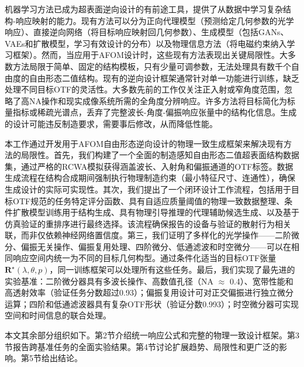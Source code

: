 机器学习方法已成为超表面逆向设计的有前途工具，提供了从数据中学习复杂结构-响应映射的能力\cite{ma2021deep,liu2018training,so2019}。现有方法可以分为正向代理模型（预测给定几何参数的光学响应）\cite{ma2021deep,malkiel2018plasmonic}、直接逆向网络（将目标响应映射回几何参数）\cite{liu2018training,an2019deep}、生成模型（包括GANs\cite{liu2018,ma2021}、VAEs\cite{ma2019probabilistic}和扩散模型\cite{hen2026,tanriover2023}，学习有效设计的分布）以及物理信息方法（将电磁约束纳入学习框架）\cite{chen2021physics,huang2022meta}。然而，当应用于AFOM设计时，这些现有方法表现出关键局限性。大多数方法局限于简单、固定的结构模板，只有少量可调参数，无法处理具有数千个自由度的自由形态二值结构\cite{ma2021deep,malkiel2018plasmonic}。现有的逆向设计框架通常针对单一功能进行训练，缺乏处理不同目标OTF的灵活性\cite{an2019deep,jiang2021}。大多数先前的工作仅关注正入射或窄角度范围，忽略了高NA操作和现实成像系统所需的全角度分辨响应\cite{kwon2018,zhou2025laplace}。许多方法将目标简化为标量指标或稀疏光谱点，丢弃了完整波长-角度-偏振响应张量中的结构化信息\cite{liu2018training}。生成的设计可能违反制造要求，需要事后修改，从而降低性能\cite{phillips2021ensemble}。

本工作通过开发用于AFOM自由形态逆向设计的物理一致生成框架来解决现有方法的局限性。首先，我们构建了一个全面的制造感知自由形态二值超表面结构数据集，通过严格的RCWA模拟获得涵盖波长、入射角和偏振通道的OTF标签。数据生成流程在结构合成期间强制执行物理制造约束（最小特征尺寸、连通性），确保生成设计的实际可实现性。其次，我们提出了一个闭环设计工作流程，包括用于目标OTF规范的任务特定评分函数、具有自适应质量阈值的物理一致数据整理、条件扩散模型训练用于结构生成、具有物理引导推理的代理辅助候选生成、以及基于仿真验证的重排序进行最终选择。该流程确保报告的设备与验证的散射行为相关联，而非仅依赖神经网络置信度。第三，我们证明了多样化的光学操作——二阶微分、偏振无关操作、偏振复用处理、四阶微分、低通滤波和时空微分——可以在相同响应空间内统一为不同的目标几何构型。通过条件化适当的目标OTF张量$\mathbf{R}^\star(\lambda, \theta, p)$，同一训练框架可以处理所有这些任务。最后，我们实现了最先进的实验基准：二阶微分器具有多波长操作、高数值孔径（NA $\approx$ 0.4）、宽带性能和高透射效率（验证任务分数超过0.93）；偏振复用设计可对正交偏振进行独立微分运算；四阶和低通滤波器具有复杂OTF形状（验证分数0.993）；时空微分器可实现空间和时间信息的联合处理。

本文其余部分组织如下。第2节介绍统一响应公式和完整的物理一致设计框架。第3节报告跨基准任务的全面实验结果。第4节讨论扩展趋势、局限性和更广泛的影响。第5节给出结论。
